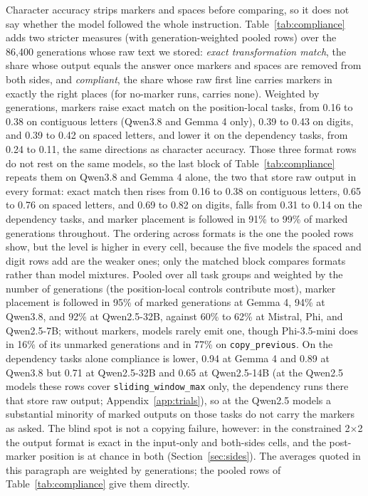 \documentclass[10pt]{article} %
\newcommand{\task}[1]{\texttt{#1}}
\begin{document}
Character accuracy strips markers and spaces before comparing, so it does not say whether the
model followed the whole instruction. Table~\ref{tab:compliance} adds two stricter measures (with generation-weighted pooled rows) over
the 86{,}400 generations whose raw text we stored: \emph{exact transformation match}, the share whose output equals the answer
once markers and spaces are removed from both sides, and \emph{compliant}, the share whose raw first line carries markers
in exactly the right places (for no-marker runs, carries none). Weighted by generations, markers raise exact match on the position-local tasks, from 0.16 to 0.38 on contiguous letters (Qwen3.8 and Gemma 4 only), 0.39 to 0.43 on digits, and 0.39
to 0.42 on spaced letters, and lower it on the dependency tasks, from 0.24 to 0.11, the same
directions as character accuracy. Those three format rows do not rest on the same models, so the last block of Table~\ref{tab:compliance} repeats them on Qwen3.8 and Gemma 4 alone, the two that store raw output in every format: exact match then rises from 0.16 to 0.38 on contiguous letters, 0.65 to 0.76 on spaced letters, and 0.69 to 0.82 on digits, falls from 0.31 to 0.14 on the dependency tasks, and marker placement is followed in 91\% to 99\% of marked generations throughout. The ordering across formats is the one the pooled rows show, but the level is higher in every cell, because the five models the spaced and digit rows add are the weaker ones; only the matched block compares formats rather than model mixtures. Pooled over all task groups and weighted by the number of generations (the position-local controls contribute most), marker placement is followed in 95\% of marked generations at Gemma 4, 94\% at Qwen3.8, and 92\% at Qwen2.5-32B, against 60\% to 62\% at Mistral, Phi, and Qwen2.5-7B; without markers, models rarely emit one, though Phi-3.5-mini does in 16\% of its unmarked generations and in 77\% on \task{copy\_previous}. On the dependency tasks alone compliance is lower, 0.94 at Gemma 4 and 0.89 at Qwen3.8 but 0.71 at Qwen2.5-32B and 0.65 at Qwen2.5-14B (at the Qwen2.5 models these rows cover \task{sliding\_window\_max} only, the dependency runs there that store raw output; Appendix~\ref{app:trials}), so at the Qwen2.5 models a substantial minority of marked outputs on those tasks do not carry the markers as asked. The blind spot is not a copying failure, however: in the constrained 2$\times$2 the output format is exact in the input-only and both-sides cells, and the post-marker position is at chance in both (Section~\ref{sec:sides}). The averages quoted in this paragraph are weighted by generations; the pooled rows of Table~\ref{tab:compliance} give them directly.
\end{document}
